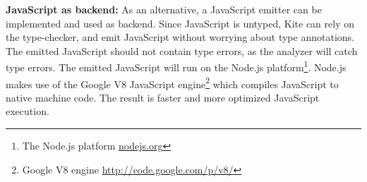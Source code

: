 \textbf{JavaScript as backend:}
As an alternative, a JavaScript emitter can be implemented and used as backend. Since JavaScript is untyped, Kite can rely on the type-checker, and emit JavaScript without worrying about type annotations. The emitted JavaScript should not contain type errors, as the analyzer will catch type errors. The emitted JavaScript will run on the Node.js platform\footnote{The Node.js platform \url{nodejs.org}}. Node.js makes use of the Google V8 JavaScript engine\footnote{Google V8 engine \url{http://code.google.com/p/v8/}} which compiles JavaScript to native machine code. The result is faster and more optimized JavaScript execution.
